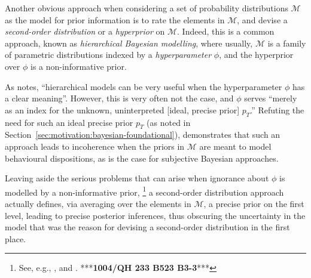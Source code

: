 Another obvious approach when considering a set of probability distributions $\mathcal{M}$
as the model for prior information is to rate the elements in $\mathcal{M}$,
and devise a \emph{second-order distribution} or a \emph{hyperprior} on $\mathcal{M}$.
Indeed, this is a common approach, known as \emph{hierarchical Bayesian modelling},
where usually, $\mathcal{M}$ is a family of parametric distributions indexed
by a \emph{hyperparameter} $\phi$, and the hyperprior over $\phi$ is a non-informative prior.

As \textcite[\S 5.10.4, p.~260]{1991:walley} notes,
``hierarchical models can be very useful when the hyperparameter $\phi$ has a clear meaning''.
However, this is very often not the case, and $\phi$ serves 
``merely as an index for the unknown, uninterpreted [ideal, precise prior] $p_T$.''
Refuting the need for such an ideal precise prior $p_T$ (as noted in Section~\ref{sec:motivation:bayesian-foundational}),
\textcite[\S 5.10.2]{1991:walley} demonstrates that such an approach leads to incoherence
when the priors in $\mathcal{M}$ are meant to model behavioural dispositions,
as is the case for subjective Bayesian approaches.

Leaving aside the serious problems that can arise when ignorance about $\phi$ is modelled by a non-informative prior,%
\footnote{See, e.g., \textcite[\S 5.5.4 (h)]{1991:walley}, and \textcite{1988:pericchi:nazareth}. ***\textbf{1004/QH 233 B523 B3-3}***}
a second-order distribution approach actually defines, via averaging over the elements in $\mathcal{M}$,
a precise prior on the first level, leading to precise posterior inferences,
thus obscuring the uncertainty in the model that was the reason
for devising a second-order distribution in the first place.

